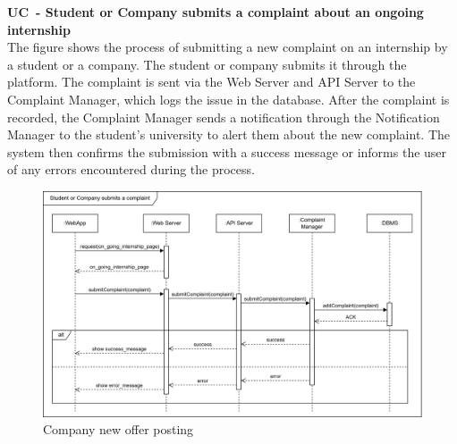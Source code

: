 \textbf{UC\cuc\  - Student or Company submits a complaint about an ongoing internship} \\
The figure shows the process of submitting a new complaint on an internship by a student or a company. The student or company submits it through the platform. The complaint is sent via the Web Server and API Server to the Complaint Manager, which logs the issue in the database. After the complaint is recorded, the Complaint Manager sends a notification through the Notification Manager to the student’s university to alert them about the new complaint. The system then confirms the submission with a success message or informs the user of any errors encountered during the process.
\begin{center}
    \begin{figure}[H]
        \centering
        \includegraphics[width=1\linewidth]{Images/Sequence diagrams/UC14.png}
        \caption{Company new offer posting}
        \label{fig:enter-label}
    \end{figure}
\end{center}

